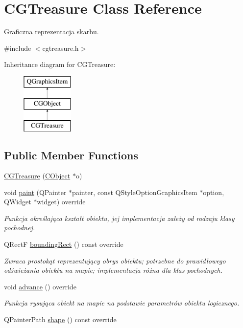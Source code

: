 \hypertarget{class_c_g_treasure}{}\section{C\+G\+Treasure Class Reference}
\label{class_c_g_treasure}


Graficzna reprezentacja skarbu.  




{\ttfamily \#include $<$cgtreasure.\+h$>$}

Inheritance diagram for C\+G\+Treasure\+:\begin{figure}[H]
\begin{center}
\leavevmode
\includegraphics[height=3.000000cm]{class_c_g_treasure}
\end{center}
\end{figure}
\subsection*{Public Member Functions}
\begin{DoxyCompactItemize}
\item 
\mbox{\hyperlink{class_c_g_treasure_a325defc3d5c7f5648d7c8d339a0be527}{C\+G\+Treasure}} (\mbox{\hyperlink{class_c_object}{C\+Object}} $\ast$o)
\item 
void \mbox{\hyperlink{class_c_g_treasure_aeab69a95590acb46aa4d20422be96560}{paint}} (Q\+Painter $\ast$painter, const Q\+Style\+Option\+Graphics\+Item $\ast$option, Q\+Widget $\ast$widget) override
\begin{DoxyCompactList}\small\item\em Funkcja określająca kształt obiektu, jej implementacja zależy od rodzaju klasy pochodnej. \end{DoxyCompactList}\item 
Q\+RectF \mbox{\hyperlink{class_c_g_treasure_a103be7d49202d07d9260917a7d6e8429}{bounding\+Rect}} () const override
\begin{DoxyCompactList}\small\item\em Zwraca prostokąt reprezentujący obrys obiektu; potrzebne do prawidłowego odświeżania obiektu na mapie; implementacja różna dla klas pochodnych. \end{DoxyCompactList}\item 
void \mbox{\hyperlink{class_c_g_treasure_a4b8a13bcae320e63a87a32a804606190}{advance}} () override
\begin{DoxyCompactList}\small\item\em Funkcja rysująca obiekt na mapie na podstawie parametrów obiektu logicznego. \end{DoxyCompactList}\item 
Q\+Painter\+Path \mbox{\hyperlink{class_c_g_treasure_a021ffe6c72146aa0e3789cf9d111ccb2}{shape}} () const override
\end{DoxyCompactItemize}
